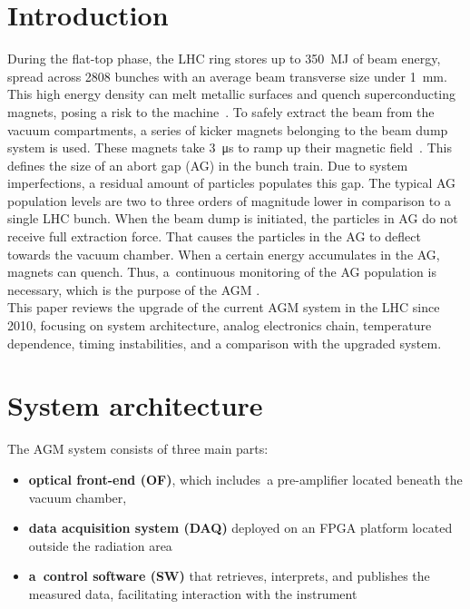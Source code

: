 \section{Introduction}
During the flat-top phase, the LHC ring stores up to \SI{350}{MJ} of beam energy,
spread across 2808 bunches with an average beam transverse size under
\SI{1}{mm}. This high energy density can melt metallic surfaces and quench
superconducting magnets, posing a risk to the machine~\cite{LHC_report}. 
To safely extract the beam from the vacuum compartments, a series of kicker
magnets belonging to the beam dump system is used. These magnets take \SI{3}{\micro\second} to
ramp up their magnetic field~\cite{beam_dump_system}. This defines the size of
an abort gap (AG) in the bunch train. Due to system imperfections, a residual amount of particles populates this gap.  The typical AG population levels are two to three orders of magnitude lower in comparison to a single LHC bunch.
When the beam dump is initiated, the particles in AG do not receive full
extraction force. That causes the particles in the AG to deflect towards the vacuum chamber. When a certain energy accumulates in the AG, magnets can quench. Thus,
a~continuous monitoring of the AG population is necessary, which is the purpose
of the AGM \cite{particles_in_ag}.\\
This paper reviews the upgrade of the current AGM system in the LHC since 2010,
focusing on system architecture, analog electronics chain, temperature
dependence, timing instabilities, and a comparison with the upgraded system.

\section{System architecture}
The AGM system consists of three main parts:

\begin{itemize}
    \item \textbf{optical front-end (OF)}, which includes~a pre-amplifier located beneath the vacuum chamber,
    \item \textbf{data acquisition system (DAQ)} deployed on an FPGA platform located outside the radiation area
    \item \textbf{a~control software (SW)} that retrieves, interprets, and publishes the measured data, facilitating interaction with the instrument
\end{itemize}

